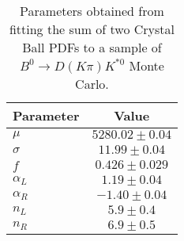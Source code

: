 \begin{table}[h]
  \centering
  \begin{tabular}{lc}
      \toprule
      Parameter & Value \\
      \midrule
      $\mu$ & $5280.02 \pm 0.04$ \\
      $\sigma$ & $11.99 \pm 0.04$ \\
      $f$ & $0.426 \pm 0.029$ \\
      $\alpha_L$ & $1.19 \pm 0.04$ \\
      $\alpha_R$ & $-1.40 \pm 0.04$ \\
      $n_L$ & $5.9 \pm 0.4$ \\
      $n_R$ & $6.9 \pm 0.5$ \\
  \bottomrule
  \end{tabular}
  \caption{Parameters obtained from fitting the sum of two Crystal Ball PDFs to a sample of $B^0 \to D(K\pi)K^{*0}$ Monte Carlo.}
\label{tab:signal_Kpi_MC_params}
\end{table}
